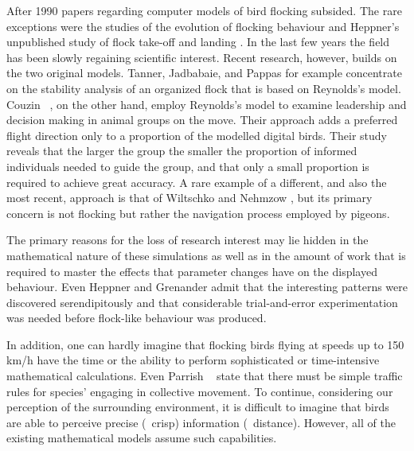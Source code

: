 After 1990 papers regarding computer models of bird flocking subsided. The rare exceptions were the studies of the evolution of flocking behaviour \cite{reynolds:1993a,reynolds:1993b,reynolds:1994,spector:2002,spector:2003} and Heppner's unpublished study of flock take-off and landing \cite{heppner:1997}. In the last few years the field has been slowly regaining scientific interest. Recent research, however, builds on the two original models. Tanner, Jadbabaie, and Pappas \cite{tanner:2003a,tanner:2003b} for example concentrate on the stability analysis of an organized flock that is based on Reynolds's model. Couzin \etal\ \cite{couzin:2005}, on the other hand, employ Reynolds's model to examine leadership and decision making in animal groups on the move. Their approach adds a preferred flight direction only to a proportion of the modelled digital birds. Their study reveals that the larger the group the smaller the proportion of informed individuals needed to guide the group, and that only a small proportion is required to achieve great accuracy. A rare example of a different, and also the most recent, approach is that of Wiltschko and Nehmzow \cite{wiltschko:2005}, but its primary concern is not flocking but rather the navigation process employed by pigeons. 

The primary reasons for the loss of research interest may lie hidden in the mathematical nature of these simulations as well as in the amount of work that is required to master the effects that parameter changes have on the displayed behaviour. Even Heppner and Grenander \cite{heppner:1990} admit that the interesting patterns were discovered serendipitously and that considerable trial-and-error experimentation was needed before flock-like behaviour was produced.

In addition, one can hardly imagine that flocking birds flying at speeds up to 150\,km/h \cite{heppner:1997} have the time or the ability to perform sophisticated or time-intensive mathematical calculations. Even Parrish \etal\ \cite{parrish:1997a} state that there must be simple traffic rules for species' engaging in collective movement. To continue, considering our perception of the surrounding environment, it is difficult to imagine that birds are able to perceive precise (\ie\ crisp) information (\eg\ distance). However, all of the existing mathematical models assume such capabilities.

